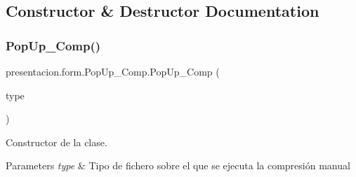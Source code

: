 \subsection{Constructor \& Destructor Documentation}
\mbox{\label{classpresentacion_1_1form_1_1PopUp__Comp_afe8952b1a34b6ed17ad1698000ceba81}} 
\subsubsection{\texorpdfstring{Pop\+Up\+\_\+\+Comp()}{PopUp\_Comp()}}
{\footnotesize\ttfamily presentacion.\+form.\+Pop\+Up\+\_\+\+Comp.\+Pop\+Up\+\_\+\+Comp (\begin{DoxyParamCaption}\item[{global.\+type}]{type }\end{DoxyParamCaption})\hspace{0.3cm}{\ttfamily [inline]}}



Constructor de la clase. 


\begin{DoxyParams}{Parameters}
{\em type} & Tipo de fichero sobre el que se ejecuta la compresión manual \\
\hline
\end{DoxyParams}

